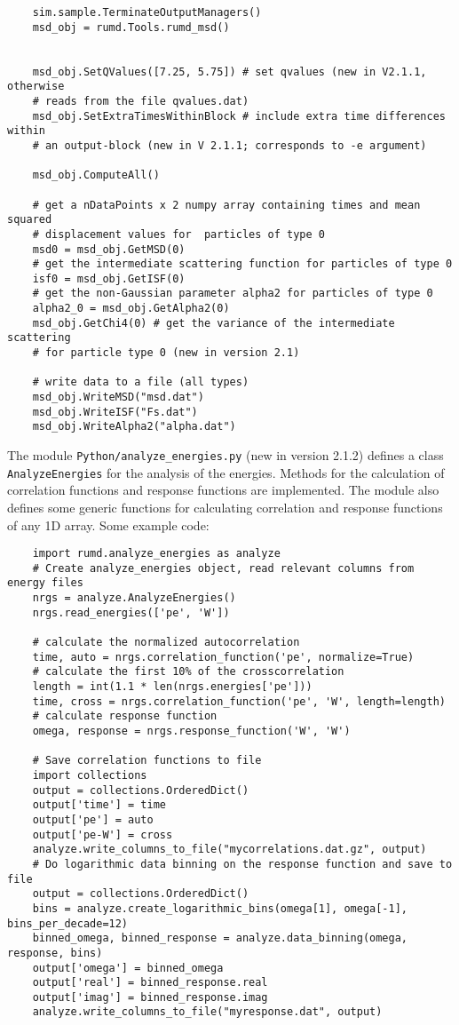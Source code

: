 \documentclass[a4paper]{article}
\begin{document}
\begin{verbatim}
    sim.sample.TerminateOutputManagers()
    msd_obj = rumd.Tools.rumd_msd()


    msd_obj.SetQValues([7.25, 5.75]) # set qvalues (new in V2.1.1, otherwise
    # reads from the file qvalues.dat)
    msd_obj.SetExtraTimesWithinBlock # include extra time differences within
    # an output-block (new in V 2.1.1; corresponds to -e argument)

    msd_obj.ComputeAll()

    # get a nDataPoints x 2 numpy array containing times and mean squared
    # displacement values for  particles of type 0
    msd0 = msd_obj.GetMSD(0)
    # get the intermediate scattering function for particles of type 0
    isf0 = msd_obj.GetISF(0)
    # get the non-Gaussian parameter alpha2 for particles of type 0
    alpha2_0 = msd_obj.GetAlpha2(0)
    msd_obj.GetChi4(0) # get the variance of the intermediate scattering 
    # for particle type 0 (new in version 2.1)

    # write data to a file (all types)
    msd_obj.WriteMSD("msd.dat")
    msd_obj.WriteISF("Fs.dat")
    msd_obj.WriteAlpha2("alpha.dat")
\end{verbatim}

The module \verb|Python/analyze_energies.py| (new in version 2.1.2) defines a class \verb|AnalyzeEnergies| for the analysis of the energies. Methods for the calculation of correlation functions and response functions are implemented. The module also defines some generic functions for calculating correlation and response functions of any 1D array. Some example code:

\begin{verbatim}
    import rumd.analyze_energies as analyze
    # Create analyze_energies object, read relevant columns from energy files
    nrgs = analyze.AnalyzeEnergies()
    nrgs.read_energies(['pe', 'W'])
    
    # calculate the normalized autocorrelation
    time, auto = nrgs.correlation_function('pe', normalize=True)
    # calculate the first 10% of the crosscorrelation
    length = int(1.1 * len(nrgs.energies['pe']))
    time, cross = nrgs.correlation_function('pe', 'W', length=length)
    # calculate response function
    omega, response = nrgs.response_function('W', 'W')
    
    # Save correlation functions to file
    import collections
    output = collections.OrderedDict()
    output['time'] = time
    output['pe'] = auto
    output['pe-W'] = cross
    analyze.write_columns_to_file("mycorrelations.dat.gz", output)
    # Do logarithmic data binning on the response function and save to file
    output = collections.OrderedDict()
    bins = analyze.create_logarithmic_bins(omega[1], omega[-1], bins_per_decade=12)
    binned_omega, binned_response = analyze.data_binning(omega, response, bins)
    output['omega'] = binned_omega
    output['real'] = binned_response.real
    output['imag'] = binned_response.imag
    analyze.write_columns_to_file("myresponse.dat", output)
\end{verbatim}
\end{document}
